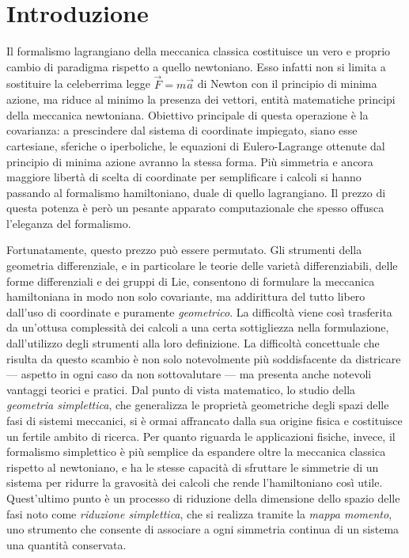 \chapter*{Introduzione} 
Il formalismo lagrangiano della meccanica classica costituisce un vero e proprio cambio di paradigma rispetto a quello newtoniano. Esso infatti non si limita a sostituire la celeberrima legge $\vec{F}=m\vec{a}$ di Newton con il principio di minima azione, ma riduce al minimo la presenza dei vettori, entità matematiche principi della meccanica newtoniana. Obiettivo principale di questa operazione è la covarianza: a prescindere dal sistema di coordinate impiegato, siano esse cartesiane, sferiche o iperboliche, le equazioni di Eulero-Lagrange ottenute dal principio di minima azione avranno la stessa forma. Più simmetria e ancora maggiore libertà di scelta di coordinate per semplificare i calcoli si hanno passando al formalismo hamiltoniano, duale di quello lagrangiano. Il prezzo di questa potenza è però un pesante apparato computazionale che spesso offusca l'eleganza del formalismo.

Fortunatamente, questo prezzo può essere permutato. Gli strumenti della geometria differenziale, e in particolare le teorie delle varietà differenziabili, delle forme differenziali e dei gruppi di Lie, consentono di formulare la meccanica hamiltoniana in modo non solo covariante, ma addirittura del tutto libero dall'uso di coordinate e puramente \emph{geometrico}. La difficoltà viene così trasferita da un'ottusa complessità dei calcoli a una certa sottigliezza nella formulazione, dall'utilizzo degli strumenti alla loro definizione. La difficoltà concettuale che risulta da questo scambio è non solo notevolmente più soddisfacente da districare --- aspetto in ogni caso da non sottovalutare --- ma presenta anche notevoli vantaggi teorici e pratici. Dal punto di vista matematico, lo studio della \emph{geometria simplettica}, che generalizza le proprietà geometriche degli spazi delle fasi di sistemi meccanici, si è ormai affrancato dalla sua origine fisica e costituisce un fertile ambito di ricerca. Per quanto riguarda le applicazioni fisiche, invece, il formalismo simplettico è più semplice da espandere oltre la meccanica classica rispetto al newtoniano, e ha le stesse capacità di sfruttare le simmetrie di un sistema per ridurre la gravosità dei calcoli che rende l'hamiltoniano così utile. Quest'ultimo punto è un processo di riduzione della dimensione dello spazio delle fasi noto come \emph{riduzione simplettica}, che si realizza tramite la \emph{mappa momento}, uno strumento che consente di associare a ogni simmetria continua di un sistema una quantità conservata.

